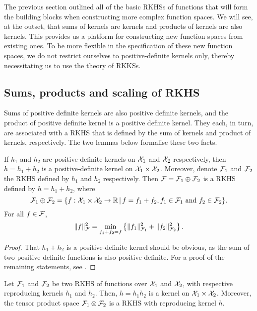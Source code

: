 
The previous section outlined all of the basic RKHSs of functions that will form the building blocks when constructing more complex function spaces.
We will see, at the outset, that sums of kernels are kernels and products of kernels are also kernels. 
This provides us a platform for constructing new function spaces from existing ones.
To be more flexible in the specification of these new function spaces, we do not restrict ourselves to positive-definite kernels only, thereby necessitating us to use the theory of RKKSs.

\subsection{Sums, products and scaling of RKHS}

Sums of positive definite kernels are also positive definite kernels, and the product of positive definite kernel is a positive definite kernel.
They each, in turn, are associated with a RKHS that is defined by the sum of kernels and product of kernels, respectively.
The two lemmas below formalise these two facts. 

\begin{lemma}\label{thm:sumkernels}
  If $h_1$ and $h_2$ are positive-definite kernels on ${\mathcal X}_1$ and ${\mathcal X}_2$ respectively, then $h = h_1 + h_2$ is a positive-definite kernel on ${\mathcal X}_1 \times {\mathcal X}_2$.
  Moreover, denote ${\mathcal F}_1$ and ${\mathcal F}_2$ the RKHS defined by $h_1$ and $h_2$ respectively.
  Then ${\mathcal F} = {\mathcal F}_1 \oplus {\mathcal F}_2$ is a RKHS defined by $h = h_1 + h_2$, where
  \[
    {\mathcal F}_1 \oplus {\mathcal F}_2 = \{ f:{\mathcal X}_1\times{\mathcal X}_2 \to\mathbb{R} \,|\, f = f_1 + f_2, f_1\in{\mathcal F}_1 \text{ and } f_2\in{\mathcal F}_2 \}.
  \]
  For all $f\in{\mathcal F}$,
  \[
    \lVert f\rVert_{\mathcal F}^2 = \min_{f_1+f_2=f} \left\{ \lVert f_1\rVert_{{\mathcal F}_1}^2 + \lVert f_2\rVert_{{\mathcal F}_2}^2 \right\}.
  \]
\end{lemma}

\begin{proof}
  That $h_1+h_2$ is a positive-definite kernel should be obvious, as the sum of two positive definite functions is also positive definite.
  For a proof of the remaining statements, see \citet[Theorem 5]{berlinet2011reproducing}.
\end{proof}

\begin{lemma}\label{thm:prodkernels}
  Let ${\mathcal F}_1$ and ${\mathcal F}_2$ be two RKHS of functions over ${\mathcal X}_1$ and ${\mathcal X}_2$, with respective reproducing kernels $h_1$ and $h_2$.
  Then, $h = h_1 h_2$ is a kernel on ${\mathcal X}_1 \times {\mathcal X}_2$.
  Moreover, the tensor product space ${\mathcal F}_1 \otimes {\mathcal F}_2$ is a RKHS with reproducing kernel $h$.
\end{lemma}

